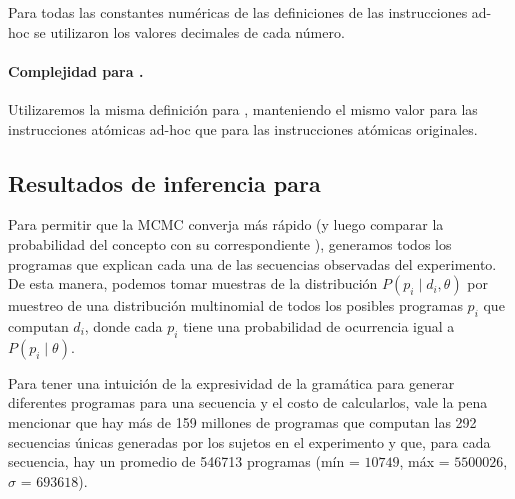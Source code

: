 Para todas las constantes numéricas de las definiciones de las instrucciones ad-hoc se utilizaron los valores decimales de cada número.

\paragraph{Complejidad para \gramgeoprima.} 

Utilizaremos la misma definición para \mdlgeo, manteniendo el mismo valor para las instrucciones atómicas ad-hoc que para las instrucciones atómicas originales.

\subsection{Resultados de inferencia para \gramgeoprima}


Para permitir que la MCMC converja más rápido (y luego comparar la probabilidad del concepto con su correspondiente \mdlgeo), generamos todos los programas que explican cada una de las secuencias observadas del experimento. De esta manera, podemos tomar muestras de la distribución $P(p_i \mid d_i, \theta)$ por muestreo de una distribución multinomial de todos los posibles programas $p_i$ que computan $d_i$, donde cada $p_i$ tiene una probabilidad de ocurrencia igual a $P(p_i \mid \theta)$.


Para tener una intuición de la expresividad de la gramática para generar diferentes programas para una secuencia y el costo de calcularlos, vale la pena mencionar que hay más de 159 millones de programas que computan las 292 secuencias únicas generadas por los sujetos en el experimento y que, para cada secuencia, hay un promedio de 546713 programas (mín = $10749$, máx = $5500026$, $\sigma$ = $693618$).


